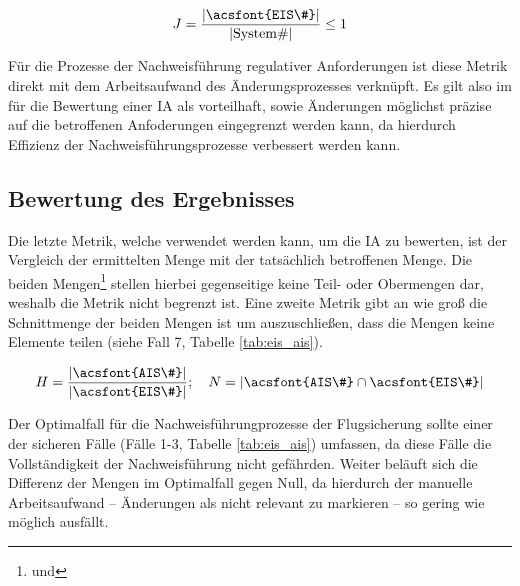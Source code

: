 $$
    J = \dfrac{|\text{\acsfont{EIS\#}}|}{|\text{System\#}|} \leq 1
$$

Für die Prozesse der Nachweisführung regulativer Anforderungen ist diese Metrik direkt mit dem Arbeitsaufwand des Änderungsprozesses verknüpft.
Es gilt also im für die Bewertung einer \ac{IA} als vorteilhaft, sowie Änderungen möglichst präzise auf die betroffenen Anfoderungen eingegrenzt werden kann, da hierdurch Effizienz der Nachweisführungsprozesse verbessert werden kann.



\subsection{Bewertung des Ergebnisses}

Die letzte Metrik, welche verwendet werden kann, um die \ac{IA} zu bewerten, ist der Vergleich der ermittelten Menge mit der tatsächlich betroffenen Menge.
Die beiden Mengen\footnote{ und } stellen hierbei gegenseitige keine Teil- oder Obermengen dar, weshalb die Metrik nicht begrenzt ist.
Eine zweite Metrik gibt an wie groß die Schnittmenge der beiden Mengen ist um auszuschließen, dass die Mengen keine Elemente teilen (siehe Fall 7, Tabelle \ref{tab:eis_ais}). 

$$
    H = \dfrac{|\text{\acsfont{AIS\#}}|}{|\text{\acsfont{EIS\#}}|}; \quad
    N = |\acsfont{AIS\#} \cap \acsfont{EIS\#}|
$$

Der Optimalfall für die Nachweisführungprozesse der Flugsicherung sollte einer der sicheren Fälle (Fälle 1-3, Tabelle \ref{tab:eis_ais}) umfassen, da diese Fälle die Vollständigkeit der Nachweisführung nicht gefährden.
Weiter beläuft sich die Differenz der Mengen im Optimalfall gegen Null, da hierdurch der manuelle Arbeitsaufwand -- Änderungen als nicht relevant zu markieren -- so gering wie möglich ausfällt.
\bigskip





